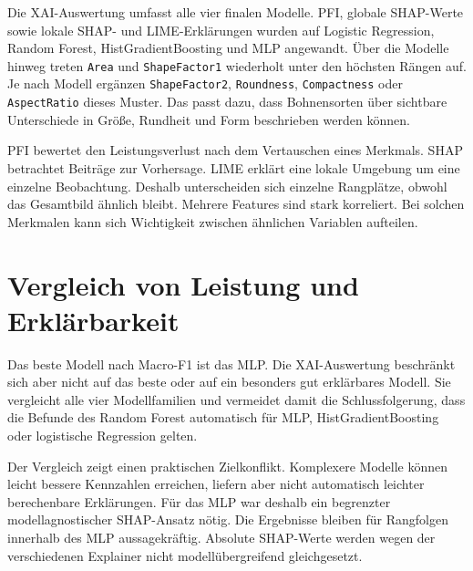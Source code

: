 Die XAI-Auswertung umfasst alle vier finalen Modelle. PFI, globale SHAP-Werte sowie lokale SHAP- und LIME-Erklärungen wurden auf Logistic Regression, Random Forest, HistGradientBoosting und MLP angewandt. Über die Modelle hinweg treten \texttt{Area} und \texttt{ShapeFactor1} wiederholt unter den höchsten Rängen auf. Je nach Modell ergänzen \texttt{ShapeFactor2}, \texttt{Roundness}, \texttt{Compactness} oder \texttt{AspectRatio} dieses Muster. Das passt dazu, dass Bohnensorten über sichtbare Unterschiede in Größe, Rundheit und Form beschrieben werden können.

PFI bewertet den Leistungsverlust nach dem Vertauschen eines Merkmals. SHAP betrachtet Beiträge zur Vorhersage. LIME erklärt eine lokale Umgebung um eine einzelne Beobachtung. Deshalb unterscheiden sich einzelne Rangplätze, obwohl das Gesamtbild ähnlich bleibt. Mehrere Features sind stark korreliert. Bei solchen Merkmalen kann sich Wichtigkeit zwischen ähnlichen Variablen aufteilen.

\section{Vergleich von Leistung und Erklärbarkeit}

Das beste Modell nach Macro-F1 ist das MLP. Die XAI-Auswertung beschränkt sich aber nicht auf das beste oder auf ein besonders gut erklärbares Modell. Sie vergleicht alle vier Modellfamilien und vermeidet damit die Schlussfolgerung, dass die Befunde des Random Forest automatisch für MLP, HistGradientBoosting oder logistische Regression gelten.

Der Vergleich zeigt einen praktischen Zielkonflikt. Komplexere Modelle können leicht bessere Kennzahlen erreichen, liefern aber nicht automatisch leichter berechenbare Erklärungen. Für das MLP war deshalb ein begrenzter modellagnostischer SHAP-Ansatz nötig. Die Ergebnisse bleiben für Rangfolgen innerhalb des MLP aussagekräftig. Absolute SHAP-Werte werden wegen der verschiedenen Explainer nicht modellübergreifend gleichgesetzt.
